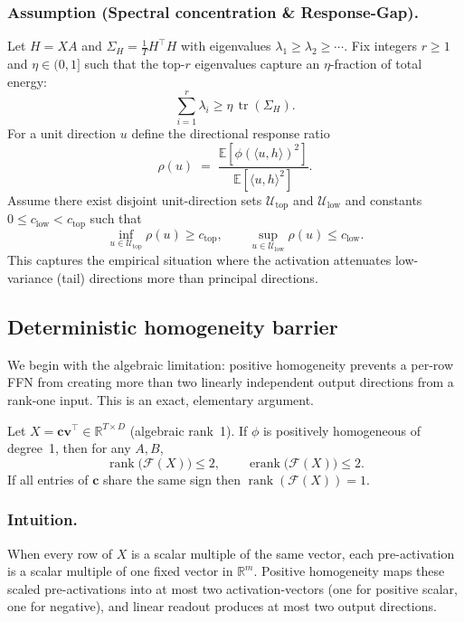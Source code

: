 \documentclass[sigconf,screen]{acmart}
\begin{document}
\subsubsection*{\bf Assumption (Spectral concentration \& Response-Gap).}
Let \(H=XA\) and \(\Sigma_H=\tfrac{1}{T}H^\top H\) with eigenvalues \(\lambda_1\ge\lambda_2\ge\cdots\). Fix integers \(r\ge1\) and \(\eta\in(0,1]\) such that the top-\(r\) eigenvalues capture an \(\eta\)-fraction of total energy:
\[
\sum_{i=1}^r \lambda_i \ge \eta\,\operatorname{tr}(\Sigma_H).
\]
For a unit direction \(u\) define the directional response ratio
\[
\rho(u)\;=\;\frac{\mathbb E[\phi(\langle u,h\rangle)^2]}{\mathbb E[\langle u,h\rangle^2]}.
\]
Assume there exist disjoint unit-direction sets \(\mathcal U_{\mathrm{top}}\) and \(\mathcal U_{\mathrm{low}}\) and constants \(0\le c_{\mathrm{low}}<c_{\mathrm{top}}\) such that
\[
\inf_{u\in\mathcal U_{\mathrm{top}}}\rho(u)\ge c_{\mathrm{top}},\qquad
\sup_{u\in\mathcal U_{\mathrm{low}}}\rho(u)\le c_{\mathrm{low}}.
\]
This captures the empirical situation where the activation attenuates low-variance (tail) directions more than principal directions.

\subsection{Deterministic homogeneity barrier}
\label{app:homogeneity_proof}

We begin with the algebraic limitation: positive homogeneity prevents a per-row FFN from creating more than two linearly independent output directions from a rank-one input. This is an exact, elementary argument.

\begin{theorem}
\label{thm:homogeneity_signed_app}
Let \(X=\mathbf c\mathbf v^\top\in\mathbb R^{T\times D}\) (algebraic rank~1). If \(\phi\) is positively homogeneous of degree~1, then for any \(A,B\),
\[
\operatorname{rank}\big(\mathcal F(X)\big)\le 2,\qquad \operatorname{erank}\big(\mathcal F(X)\big)\le 2.
\]
If all entries of \(\mathbf c\) share the same sign then \(\operatorname{rank}(\mathcal F(X))=1\).
\end{theorem}

\subsubsection*{\bf Intuition.}
When every row of \(X\) is a scalar multiple of the same vector, each pre-activation is a scalar multiple of one fixed vector in \(\mathbb R^m\). Positive homogeneity maps these scaled pre-activations into at most two activation-vectors (one for positive scalar, one for negative), and linear readout produces at most two output directions.
\end{document}
